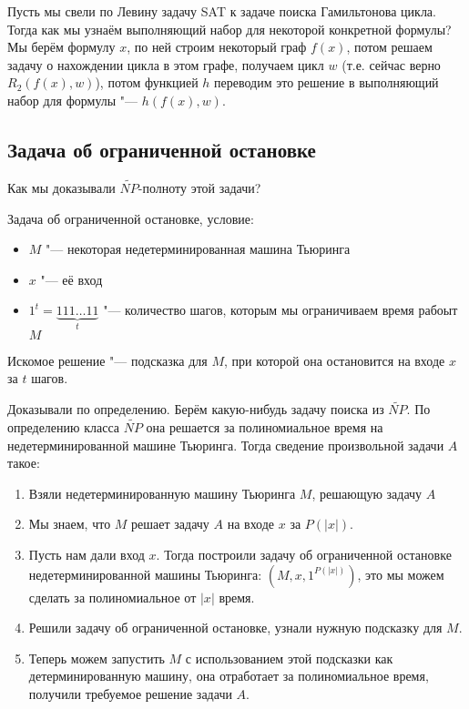 	\begin{exmp}
		Пусть мы свели по Левину задачу SAT к задаче поиска Гамильтонова цикла.
		Тогда как мы узнаём выполняющий набор для некоторой конкретной формулы?
		Мы берём формулу $x$, по ней строим некоторый граф $f(x)$, потом решаем задачу
		о нахождении цикла в этом графе, получаем цикл $w$ (т.е. сейчас верно $R_2(f(x), w)$),
		потом функцией $h$ переводим это решение в выполняющий набор для формулы "--- $h(f(x), w)$.
	\end{exmp}

\subsection{Задача об ограниченной остановке}
	Как мы доказывали $\widetilde{NP}$-полноту этой задачи?
	\begin{Rem}
		Задача об ограниченной остановке, условие:
		\begin{itemize}
			\item $M$ "--- некоторая недетерминированная машина Тьюринга
			\item $x$ "--- её вход
			\item $1^t = \underbrace{111\dots11}_{t}$ "--- количество шагов, которым мы ограничиваем время рабоыт $M$
		\end{itemize}
		Искомое решение "--- подсказка для $M$, при которой она остановится на входе $x$ за $t$ шагов.
	\end{Rem}
	Доказывали по определению.
	Берём какую-нибудь задачу поиска из $\widetilde{NP}$.
	По определению класса $\widetilde{NP}$ она решается за полиномиальное время на недетерминированной машине Тьюринга.
	Тогда сведение произвольной задачи $A$ такое:
	\begin{enumerate}
		\item Взяли недетерминированную машину Тьюринга $M$, решающую задачу $A$
		\item Мы знаем, что $M$ решает задачу $A$ на входе $x$ за $P(|x|)$.
		\item
			Пусть нам дали вход $x$. Тогда построили задачу об ограниченной остановке недетерминированной
			машины Тьюринга: $(M, x, 1^{P(|x|)})$,
			это мы можем сделать за полиномиальное от $|x|$ время.
		\item
			Решили задачу об ограниченной остановке, узнали нужную подсказку для $M$.
		\item
			Теперь можем запустить $M$ с использованием этой подсказки как детерминированную машину,
			она отработает за полиномиальное время, получили требуемое решение задачи $A$.
	\end{enumerate}


